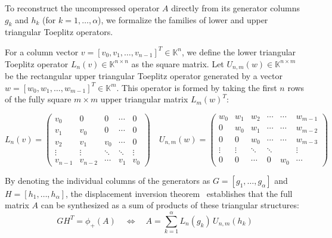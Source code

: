 To reconstruct the uncompressed operator $A$ directly from its
generator columns $g_k$ and $h_k$ (for $k = 1, \dots, \alpha$), we
formalize the families of lower and upper triangular Toeplitz operators.

For a column vector $v = [v_0, v_1, \dots, v_{n-1}]^T \in
\mathbb{K}^n$, we define the lower triangular Toeplitz operator
$L_n(v) \in \mathbb{K}^{n \times n}$ as the square matrix.
Let $U_{n,m}(w) \in \mathbb{K}^{n \times m}$ be the rectangular upper
triangular Toeplitz operator generated by a vector $w = [w_0, w_1,
\dots, w_{m-1}]^T \in \mathbb{K}^m$.
This operator is formed by taking the first $n$ rows of the fully
square $m \times m$ upper triangular matrix $L_m(w)^T$:

\begin{equation*}
  L_n(v) =
  \begin{pmatrix}
    v_0     & 0       & 0      & \cdots & 0      \\
    v_1     & v_0     & 0      & \cdots & 0      \\
    v_2     & v_1     & v_0    & \cdots & 0      \\
    \vdots  & \vdots  & \ddots & \ddots & \vdots \\
    v_{n-1} & v_{n-2} & \cdots & v_1    & v_0
  \end{pmatrix}
  \quad
  U_{n,m}(w) =
  \begin{pmatrix}
    w_0    & w_1    & w_2    & \cdots & \cdots & w_{m-1} \\
    0      & w_0    & w_1    & \cdots & \cdots & w_{m-2} \\
    0      & 0      & w_0    & \cdots & \cdots & w_{m-3} \\
    \vdots & \vdots & \ddots & \ddots &        & \vdots  \\
    0      & 0      & \cdots & 0      & w_0    & \cdots
  \end{pmatrix}
\end{equation*}

By denoting the individual columns of the generators as $G = [g_1,
\dots, g_\alpha]$ and $H = [h_1, \dots, h_\alpha]$, the displacement
inversion theorem~\cite{aecf-2017-pdf} establishes that the full
matrix $A$ can be synthesized as a sum of products of these
triangular structures:
\begin{equation} \label{eq:SigmaLU}
  G H^T = \phi_+(A) \quad \iff \quad A = \sum_{k=1}^{\alpha} L_n(g_k)
  \, U_{n,m}(h_k)
\end{equation}
